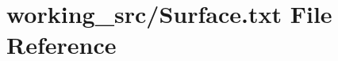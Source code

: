 \hypertarget{_surface_8txt}{}\section{working\+\_\+src/\+Surface.txt File Reference}
\label{_surface_8txt}
